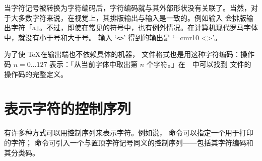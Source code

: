 \documentclass{book}
\begin{document}
当字符记号被转换为字符编码后，字符编码就与其外部形状没有关联了。当然，对于大多数字符来说，在视觉上，其排版输出与输入是一致的。例如输入  会排版输出字符「a」。不过，即使在常见的符号中，也有例外情况。在计算机现代罗马字体中，就没有小于号和大于号。
%
输入 `\verb.<>.' 得到的输出是 `{\font\cmr=cmr10 \cmr<>}'。

为了使 \TeX 在输出端也不依赖具体的机器， 文件格式也是用这种字符编码：操作码 $n=0\ldots127$ 表示：「从当前字体中取出第 $n$ 个字符。」在~\cite{Knuth:TeXprogram}~中可以找到  文件的操作码的完整定义。

\section{表示字符的控制序列}

有许多种方式可以用控制序列来表示字符。例如说， 命令可以指定一个用于打印的字符； 命令可引入一个与置顶字符记号同义的控制序列——包括其字符编码和其分类码。

\end{document}
